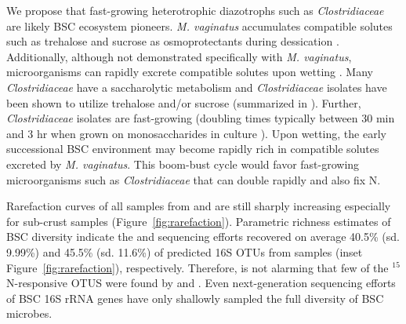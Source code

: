 We propose that fast-growing heterotrophic diazotrophs such as
\textit{Clostridiaceae} are likely BSC ecosystem pioneers. \textit{M.
vaginatus} accumulates compatible solutes such as trehalose and sucrose as
osmoprotectants during dessication \citep{Rajeev_2013}. Additionally, although
not demonstrated specifically with \textit{M. vaginatus}, microorganisms can
rapidly excrete compatible solutes upon wetting \citep{Poolman_1998}. Many
\textit{Clostridiaceae} have a saccharolytic metabolism \citep{Wiegel_2006} and
\textit{Clostridiaceae} isolates have been shown to utilize trehalose and/or
sucrose (summarized in \citet{Wiegel_2006}). Further, \textit{Clostridiaceae}
isolates are fast-growing (doubling times typically between 30 min and 3 hr
when grown on monosaccharides in culture \citep{Wiegel_2006}). Upon wetting,
the early successional BSC environment may become rapidly rich in compatible
solutes excreted by \textit{M. vaginatus}. This boom-bust cycle would favor
fast-growing microorganisms such as \textit{Clostridiaceae} that can double
rapidly and also fix N.

Rarefaction curves of all samples from \citet{Steven_2013} and
\citet{Garcia_Pichel_2013} are still sharply increasing especially for
sub-crust samples (Figure~\ref{fig:rarefaction}). Parametric richness estimates
of BSC diversity indicate the \citet{Steven_2013} and
\citet{Garcia_Pichel_2013} sequencing efforts recovered on average 40.5\% (sd.
9.99\%) and 45.5\% (sd.  11.6\%) of predicted 16S OTUs from samples (inset
Figure~\ref{fig:rarefaction}), respectively. Therefore,
is not alarming that few of the $^{15}$N-responsive OTUS were found by
\citet{Garcia_Pichel_2013} and \citet{Steven_2013}. Even next-generation
sequencing efforts of BSC 16S rRNA genes have only shallowly sampled the full
diversity of BSC microbes.  

